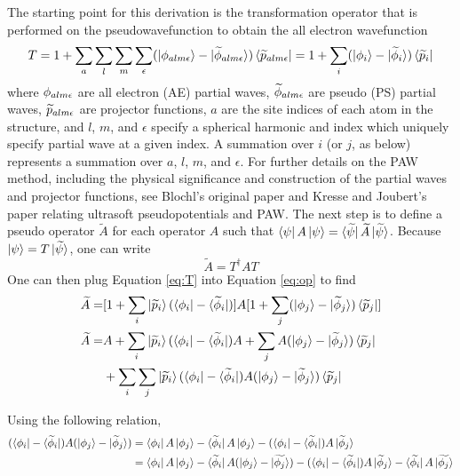 \documentclass[12pt]{article}
\begin{document}
The starting point for this derivation is the transformation operator that
is performed on the pseudowavefunction to obtain the all electron wavefunction
\begin{equation}
T=1+\sum_a\sum_l\sum_m\sum_{\epsilon}(\ket{\phi_{alm\epsilon}}-\ket{\widetilde{\phi}_{alm\epsilon}})
\bra{\widetilde{p}_{alm\epsilon}}=1+\sum_i(\ket{\phi_i}-\ket{\widetilde{\phi}_i})
\bra{\widetilde{p}_i}
\label{eq:T}
\end{equation}
where $\phi_{alm\epsilon}$ are all electron (AE) partial waves, $\widetilde{\phi}_{alm\epsilon}$
are pseudo (PS) partial waves, $\widetilde{p}_{alm\epsilon}$ are projector functions,
$a$ are the site indices of each atom in the structure, and $l$, $m$, and $\epsilon$
specify a spherical harmonic and index which uniquely specify partial wave at a given
index. A summation over $i$ (or $j$, as below) represents a summation over $a$, $l$, $m$,
and $\epsilon$. For further details on the PAW method, including the physical significance
and construction of the partial waves and projector functions, see Blochl's original paper
and Kresse and Joubert's paper relating ultrasoft pseudopotentials and PAW.\cite{blochl,kresse_joubert}
The next step is to define a pseudo operator $\widetilde{A}$ for each operator $A$
such that $\bra{\psi}A\ket{\psi}=\bra{\widetilde{\psi}}\widetilde{A}\ket{\widetilde{\psi}}$.
Because $\ket{\psi}=T\ket{\widetilde{\psi}}$, one can write
\begin{equation}
\widetilde{A}=T^{\dagger}AT
\label{eq:op}
\end{equation}
One can then plug Equation \ref{eq:T} into Equation \ref{eq:op} to find
\begin{equation}
\begin{split}
\widetilde{A} = & [1+\sum_i\ket{\widetilde{p}_i}(\bra{\phi_i}-\bra{\widetilde{\phi}_i})]
A[1+\sum_j(\ket{\phi_j}-\ket{\widetilde{\phi}_j})
\bra{\widetilde{p}_j}]\\
\widetilde{A} = & A+\sum_i\ket{\widetilde{p}_i}(\bra{\phi_i}-\bra{\widetilde{\phi}_i})A
+\sum_j A(\ket{\phi_j}-\ket{\widetilde{\phi}_j})\bra{\widetilde{p}_j}\\
& +\sum_i\sum_j\ket{\widetilde{p}_i}(\bra{\phi_i}-\bra{\widetilde{\phi}_i})A
(\ket{\phi_j}-\ket{\widetilde{\phi}_j})\bra{\widetilde{p}_j}
\end{split}
\label{eq:res}
\end{equation}

Using the following relation,
\begin{equation}
\begin{split}
(\bra{\phi_i}-\bra{\widetilde{\phi}_i})A(\ket{\phi_j}-\ket{\widetilde{\phi}_j})
& =\bra{\phi_i}A\ket{\phi_j}-\bra{\widetilde{\phi}_i}A\ket{\phi_j}
-(\bra{\phi_i}-\bra{\widetilde{\phi}_i})A\ket{\widetilde{\phi}_j}\\
& =\bra{\phi_i}A\ket{\phi_j}-\bra{\widetilde{\phi}_i}A(\ket{\phi_j}-\ket{\widetilde{\phi_j}})
-(\bra{\phi_i}-\bra{\widetilde{\phi}_i})A\ket{\widetilde{\phi}_j}
-\bra{\widetilde{\phi_i}}A\ket{\widetilde{\phi_j}}
\end{split}
\end{equation}
\end{document}
